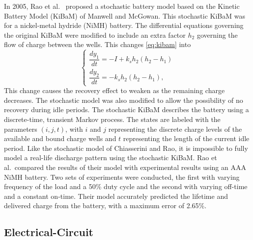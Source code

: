 \documentclass[../zhang_thesis.tex]{subfiles}
\begin{document}
In 2005, Rao et al.~\cite{rao05} proposed a stochastic battery model based on the Kinetic Battery Model (KiBaM) of Manwell and McGowan. This stochastic KiBaM was for a nickel-metal hydride (NiMH) battery. The differential equations governing the original KiBaM were modified to include an extra factor $h_2$ governing the flow of charge between the wells. This changes \autoref{eq:kibam} into
\begin{equation}
    \begin{cases}
        \dfrac{dy_1}{dt} = -I + k_s h_2 \left( h_2 - h_1 \right) \\
        \dfrac{dy_2}{dt} = -k_s h_2 \left( h_2 - h_1 \right),
    \end{cases}
\end{equation}
This change causes the recovery effect to weaken as the remaining charge decreases. The stochastic model was also modified to allow the possibility of no recovery during idle periods. The stochastic KiBaM describes the battery using a discrete-time, transient Markov process. The states are labeled with the parameters $(i,j,t)$, with $i$ and $j$ representing the discrete charge levels of the available and bound charge wells and $t$ representing the length of the current idle period.
Like the stochastic model of Chiasserini and Rao, it is impossible to fully model a real-life discharge pattern using the stochastic KiBaM. Rao et al.\ compared the results of their model with experimental results using an AAA NiMH battery. Two sets of experiments were conducted, the first with varying frequency of the load and a 50\% duty cycle and the second with varying off-time and a constant on-time. Their model accurately predicted the lifetime and delivered charge from the
battery, with a maximum error of 2.65\%.

\subsection{Electrical-Circuit}
\end{document}
